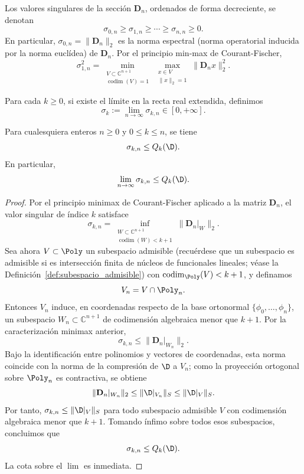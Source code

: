 \begin{defn}\label{def:sigma_kn}
	Los valores singulares de la sección $\mathbf{D}_n$, ordenados de forma decreciente, se denotan
	\[
		\sigma_{0,n} \geq \sigma_{1,n} \geq \cdots \geq \sigma_{n,n} \geq 0.
	\]
	En particular, $\sigma_{0,n} = \|\mathbf{D}_n\|_2$ es la norma espectral (norma operatorial inducida por la norma euclídea) de $\mathbf{D}_n$. Por el principio min-max de Courant-Fischer,
	\[
		\sigma_{1,n}^2 = \min_{\substack{V \subset \mathbb{C}^{n+1} \\ \operatorname{codim}(V) = 1}} \max_{\substack{x \in V \\ \|x\|_2 = 1}} \|\mathbf{D}_n x\|_2^2.
	\]
\end{defn}

\begin{defn}\label{def:indice_Sigma_k}
	Para cada $k\ge 0$, si existe el límite en la recta real extendida, definimos
	\[
		\sigma_k := \lim_{n\to\infty} \sigma_{k,n} \in [0,+\infty].
	\]
\end{defn}

\begin{prop}\label{prop:sigma_qk}
	Para cualesquiera enteros $n \ge 0$ y $0 \le k \le n$, se tiene
	\[
		\sigma_{k,n} \le Q_k(\D).
	\]
	En particular,
	\[
		\lim_{n \to \infty} \sigma_{k,n} \le Q_k(\D).
	\]
\end{prop}

\begin{proof}
	Por el principio minimax de Courant-Fischer aplicado a la matriz $\mathbf{D}_n$, el valor singular de índice $k$ satisface
	\[
		\sigma_{k,n} = \inf_{\substack{W \subset \mathbb{C}^{n+1} \\ \operatorname{codim}(W) < k+1}} \|\mathbf{D}_n|_W\|_2.
	\]
	Sea ahora $V \subset \Poly$ un subespacio admisible (recuérdese que un subespacio es admisible si es intersección finita de núcleos de funcionales lineales; véase la Definición~\ref{def:subespacio_admisible}) con $\operatorname{codim}_{\Poly}(V) < k+1$, y definamos
	\[
		V_n = V \cap \Poly_{n}.
	\]
	Entonces $V_n$ induce, en coordenadas respecto de la base ortonormal $\{\phi_0,\dots,\phi_{n}\}$, un subespacio $W_n \subset \mathbb{C}^{n+1}$ de codimensión algebraica menor que $k+1$. Por la caracterización minimax anterior,
	\[
		\sigma_{k,n} \le \|\mathbf{D}_n|_{W_n}\|_2.
	\]
	Bajo la identificación entre polinomios y vectores de coordenadas, esta norma coincide con la norma de la compresión de $\D$ a $V_n$; como la proyección ortogonal sobre $\Poly_{n}$ es contractiva, se obtiene
	\[
		\|\mathbf{D}_n|_{W_n}\|_2 \le \|\D|_{V_n}\|_S \le \|\D|_V\|_S.
	\]
	Por tanto, $\sigma_{k,n} \le \|\D|_V\|_S$ para todo subespacio admisible $V$ con codimensión algebraica menor que $k+1$. Tomando ínfimo sobre todos esos subespacios, concluimos que
	\[
		\sigma_{k,n} \le Q_k(\D).
	\]
	La cota sobre el $\lim$ es inmediata.
\end{proof}

